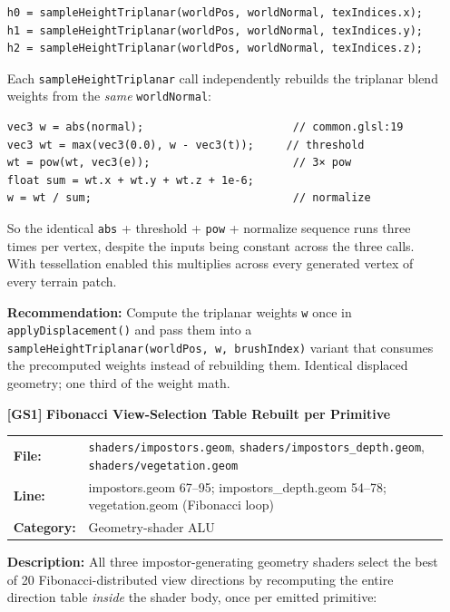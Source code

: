 \documentclass[a4paper,12pt]{article}
\newcommand{\severitybox}[2]{%
  \colorbox{#1}{\makebox[2.5cm][c]{\textcolor{white}{\textbf{#2}}}}%
}
\begin{document}
\begin{enumerate}[leftmargin=*]
\begin{lstlisting}
h0 = sampleHeightTriplanar(worldPos, worldNormal, texIndices.x);
h1 = sampleHeightTriplanar(worldPos, worldNormal, texIndices.y);
h2 = sampleHeightTriplanar(worldPos, worldNormal, texIndices.z);
\end{lstlisting}

  Each \texttt{sampleHeightTriplanar} call independently rebuilds the triplanar
  blend weights from the \emph{same} \texttt{worldNormal}:

\begin{lstlisting}
vec3 w = abs(normal);                       // common.glsl:19
vec3 wt = max(vec3(0.0), w - vec3(t));     // threshold
wt = pow(wt, vec3(e));                      // 3× pow
float sum = wt.x + wt.y + wt.z + 1e-6;
w = wt / sum;                               // normalize
\end{lstlisting}

  So the identical \texttt{abs} + threshold + \texttt{pow} + normalize sequence
  runs three times per vertex, despite the inputs being constant across the
  three calls. With tessellation enabled this multiplies across every generated
  vertex of every terrain patch.

  \textbf{Recommendation:}
  Compute the triplanar weights \texttt{w} once in \texttt{applyDisplacement()}
  and pass them into a \texttt{sampleHeightTriplanar(worldPos, w, brushIndex)}
  variant that consumes the precomputed weights instead of rebuilding them.
  Identical displaced geometry; one third of the weight math.

\item[\textbf{[GS1]}] \textbf{Fibonacci View-Selection Table Rebuilt per Primitive}
  \hfill \severitybox{mediumcolor}{MEDIUM}

  \begin{tabular}{ll}
    \textbf{File:} & \texttt{shaders/impostors.geom}, \texttt{shaders/impostors\_depth.geom}, \texttt{shaders/vegetation.geom} \\
    \textbf{Line:} & impostors.geom 67--95; impostors\_depth.geom 54--78; vegetation.geom (Fibonacci loop) \\
    \textbf{Category:} & Geometry-shader ALU \\
  \end{tabular}

  \textbf{Description:}
  All three impostor-generating geometry shaders select the best of 20
  Fibonacci-distributed view directions by recomputing the entire direction
  table \emph{inside} the shader body, once per emitted primitive:


\end{enumerate}
\end{document}
